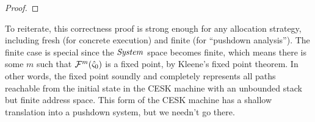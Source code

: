 \begin{proof}
\end{proof}

To reiterate, this correctness proof is strong enough for any allocation strategy, including fresh (for concrete execution) and finite (for ``pushdown analysis'').
%
The finite case is special since the $\mathit{System}$ space becomes finite, which means there is some $m$ such that ${\mathcal F}^m(\hat\varsigma_0)$ is a fixed point, by Kleene's fixed point theorem.
%
In other words, the fixed point soundly and completely represents all paths reachable from the initial state in the CESK machine with an unbounded stack but finite address space.
%
This form of the CESK machine has a shallow translation into a pushdown system, but we needn't go there.
